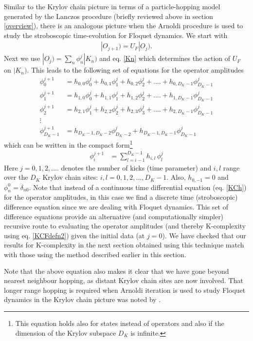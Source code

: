 \documentclass[a4paper,12pt]{article}
\begin{document}
Similar to the Krylov chain picture in terms of a particle-hopping model generated by the Lanczos procedure (briefly reviewed above in section \ref{overview}), there is an  analogous picture when the Arnoldi procedure is used to study the stroboscopic time-evolution for Floquet dynamics. We start with
\begin{align}
|O_{j+1})=U_F |O_j).
 \end{align}
Next we use $|O_{j})=\sum_n \phi_n^j |K_n)$ and eq. \eqref{Kn} which determines the action of $U_F$ on $|K_n)$. This leads to the following set of equations for the operator amplitudes
\begin{align}
\phi_0^{j+1}&= h_{0,0}\phi_0^j+h_{0,1}\phi_1^j+h_{0,2}\phi_2^j+....+h_{0,D_K-1}\phi_{D_K-1}^j \nonumber\\
\phi_1^{j+1}&= h_{1,0}\phi_0^j+h_{1,1}\phi_1^j+h_{1,2}\phi_2^j+....+h_{1,D_K-1}\phi_{D_K-1}^j \nonumber\\
\phi_2^{j+1}&= h_{2,1}\phi_1^j+h_{2,2}\phi_2^j+h_{2,3}\phi_3^j+....+h_{2,D_K-1}\phi_{D_K-1}^j \nonumber\\
\vdots \nonumber\\
\phi_{D_K-1}^{j+1}&= h_{D_K-1,D_K-2} \phi_{D_K-2}^ j+h_{D_K-1,D_K-1} \phi_{D_K-1}^ j 
\end{align}
which can be written in the compact form\footnote{This equation holds also for states instead of operators and also if the dimension of the Krylov subspace $D_K$ is infinite.} 
\begin{align}
\phi_i^{j+1}&=\sum_{l=i-1}^{D_K -1} h_{i,l} \, \phi _l^j
\end{align}
Here $j=0,1,2,....$ denotes the number of kicks (time parameter) and $i,l$ range over the $D_K$ Krylov chain sites: $i,l=0,1,2,..., D_K-1$. Also, $h_{0,-1}=0$ and $\phi_n^ 0= \delta_{n0}$. Note that instead of a continuous time differential equation (eq. \eqref{KCh}) for the operator amplitudes, in this case we find a discrete time (stroboscopic) difference equation since we are dealing with Floquet dynamics. This set of difference equations provide an alternative (and computationally simpler) recursive route to evaluating the operator amplitudes (and thereby K-complexity using eq. \eqref{KCFdefn2}) given the initial data (at $j=0$). We have checked that our results for K-complexity in the next section   obtained using this technique match with those using the method described earlier in this section. 

Note that the above equation also makes it clear that we have gone beyond nearest neighbour hopping, as distant Krylov chain sites are now involved. That longer range hopping is required when Arnoldi iteration is used to study Floquet dynamics in the Krylov chain picture was noted %
by \cite{Yates:2021asz}.
\end{document}
